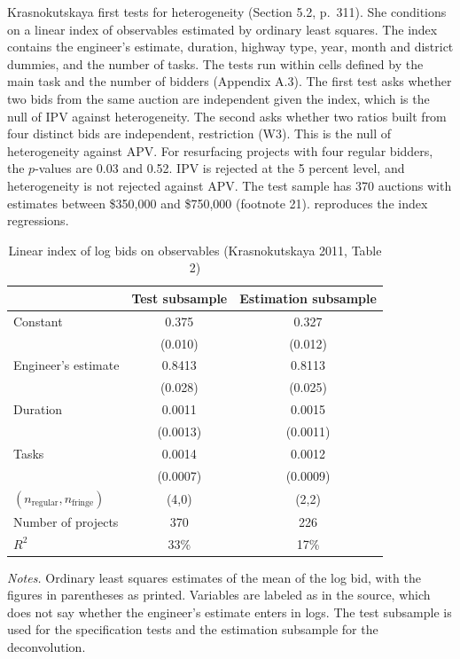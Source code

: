 Krasnokutskaya first tests for heterogeneity (Section 5.2, p.~311). She conditions on a linear index
of observables estimated by ordinary least squares. The index contains the engineer's estimate,
duration, highway type, year, month and district dummies, and the number of tasks. The tests run
within cells defined by the main task and the number of bidders (Appendix A.3). The first test asks
whether two bids from the same auction are independent given the index, which is the null of IPV
against heterogeneity. The second asks whether two ratios built from four distinct bids are
independent, restriction (W3). This is the null of heterogeneity against APV. For resurfacing
projects with four regular bidders, the $p$-values are 0.03 and 0.52. IPV is rejected at the 5 percent
level, and heterogeneity is not rejected against APV. The test sample has 370 auctions with
estimates between \$350,000 and \$750,000 (footnote 21).  reproduces the
index regressions.

\begin{table}[htbp]
\centering
\caption{Linear index of log bids on observables (Krasnokutskaya 2011, Table 2)}
\label{tab:15-krasno-index}
\begin{tabular}{lcc}
\toprule
 & Test subsample & Estimation subsample\\
\midrule
Constant & 0.375 & 0.327\\
 & (0.010) & (0.012)\\
Engineer's estimate & 0.8413 & 0.8113\\
 & (0.028) & (0.025)\\
Duration & 0.0011 & 0.0015\\
 & (0.0013) & (0.0011)\\
Tasks & 0.0014 & 0.0012\\
 & (0.0007) & (0.0009)\\
\addlinespace
$(n_{\text{regular}},n_{\text{fringe}})$ & (4,0) & (2,2)\\
Number of projects & 370 & 226\\
$R^2$ & 33\% & 17\%\\
\bottomrule
\end{tabular}

\smallskip
\begin{minipage}{0.8\textwidth}
\footnotesize \textit{Notes.} Ordinary least squares estimates of the mean of the log bid, with the figures in
parentheses as printed. Variables are labeled as in the source, which does not say whether the
engineer's estimate enters in logs. The test subsample is used for the specification tests and the
estimation subsample for the deconvolution.
\end{minipage}
\end{table}

